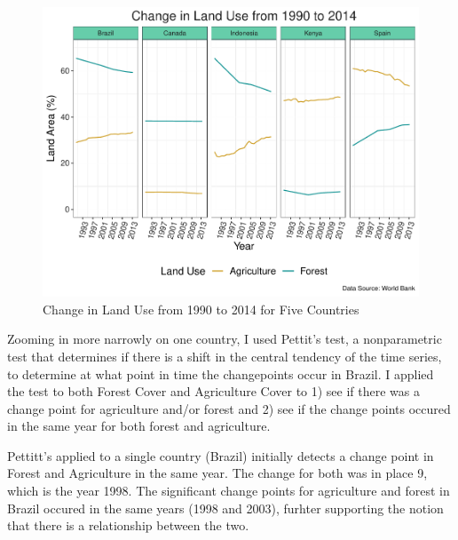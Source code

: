\documentclass[12pt,]{article}
\newenvironment{Shaded}{\begin{snugshade}}{\end{snugshade}}
\newcommand{\KeywordTok}[1]{\textcolor[rgb]{0.13,0.29,0.53}{\textbf{#1}}}
\newcommand{\CommentTok}[1]{\textcolor[rgb]{0.56,0.35,0.01}{\textit{#1}}}
\newcommand{\OperatorTok}[1]{\textcolor[rgb]{0.81,0.36,0.00}{\textbf{#1}}}
\newcommand{\NormalTok}[1]{#1}
\begin{document}
\begin{figure}
\centering
\includegraphics{Marx_ENV872_Project_files/figure-latex/unnamed-chunk-7-1.pdf}
\caption{\label{fig:fig4}Change in Land Use from 1990 to 2014 for Five
Countries}
\end{figure}

Zooming in more narrowly on one country, I used Pettit's test, a
nonparametric test that determines if there is a shift in the central
tendency of the time series, to determine at what point in time the
changepoints occur in Brazil. I applied the test to both Forest Cover
and Agriculture Cover to 1) see if there was a change point for
agriculture and/or forest and 2) see if the change points occured in the
same year for both forest and agriculture.

Pettitt's applied to a single country (Brazil) initially detects a
change point in Forest and Agriculture in the same year. The change for
both was in place 9, which is the year 1998. The significant change
points for agriculture and forest in Brazil occured in the same years
(1998 and 2003), furhter supporting the notion that there is a
relationship between the two.

\begin{Shaded}
\end{Shaded}
\end{document}
